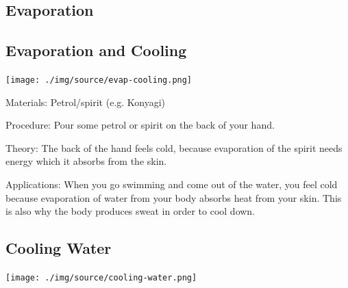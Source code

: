 \begin{multicols}{2}
\columnbreak


\section*{Evaporation}


\subsection{Evaporation and Cooling}

\begin{center}
\texttt{[image: ./img/source/evap-cooling.png]}
\end{center}

\begin{description*}
\item[Materials:]{Petrol/spirit (e.g. Konyagi)}
\item[Procedure:]{Pour some petrol or spirit on the back of your hand.}
\item[Theory:]{The back of the hand feels cold, because evaporation of the spirit needs energy which it absorbs from the skin.}
\item[Applications:]{When you go swimming and come out of the water, you feel cold because evaporation of water from your body absorbs heat from your skin. This is also why the body produces sweat in order to cool down.}
\end{description*}

\subsection{Cooling Water}

\begin{center}
\texttt{[image: ./img/source/cooling-water.png]}
\end{center}


\end{multicols}
